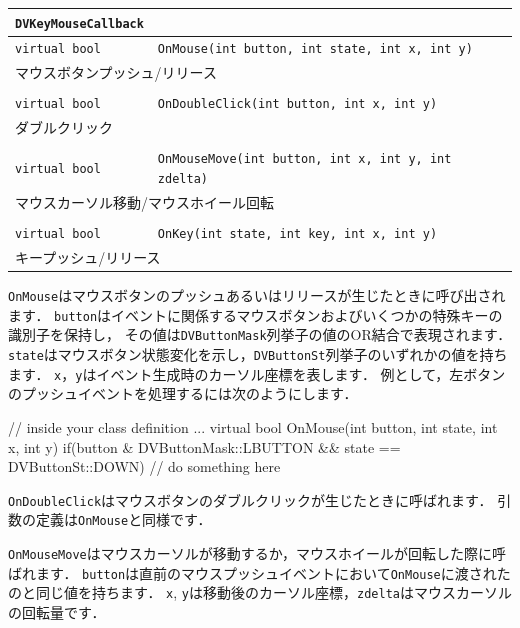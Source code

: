 \begin{center}
\begin{tabular}{p{.2\hsize}p{.7\hsize}}
\texttt{DVKeyMouseCallback}								\\ \midrule
\texttt{virtual bool} & \texttt{OnMouse(int button, int state, int x, int y)}		\\
\multicolumn{2}{l}{マウスボタンプッシュ/リリース}	\\
\\
\texttt{virtual bool} & \texttt{OnDoubleClick(int button, int x, int y)}			\\
\multicolumn{2}{l}{ダブルクリック}	\\
\\
\texttt{virtual bool} & \texttt{OnMouseMove(int button, int x, int y, int zdelta)}	\\
\multicolumn{2}{l}{マウスカーソル移動/マウスホイール回転}	\\
\\
\texttt{virtual bool} & \texttt{OnKey(int state, int key, int x, int y)}			\\
\multicolumn{2}{l}{キープッシュ/リリース}	\\
\end{tabular}
\end{center}

\texttt{OnMouse}はマウスボタンのプッシュあるいはリリースが生じたときに呼び出されます．
\texttt{button}はイベントに関係するマウスボタンおよびいくつかの特殊キーの識別子を保持し，
\KLUDGE その値は\texttt{DVButtonMask}列挙子の値のOR結合で表現されます．
\texttt{state}はマウスボタン状態変化を示し，\texttt{DVButtonSt}列挙子のいずれかの値を持ちます．
\texttt{x}，\texttt{y}はイベント生成時のカーソル座標を表します．
\KLUDGE 例として，左ボタンのプッシュイベントを処理するには次のようにします．
\begin{sourcecode}
// inside your class definition ...
virtual bool OnMouse(int button, int state, int x, int y){
    if(button & DVButtonMask::LBUTTON && state == DVButtonSt::DOWN){
        // do something here
    }
}
\end{sourcecode}

\texttt{OnDoubleClick}はマウスボタンのダブルクリックが生じたときに呼ばれます．
\KLUDGE 引数の定義は\texttt{OnMouse}と同様です．

\texttt{OnMouseMove}はマウスカーソルが移動するか，マウスホイールが回転した際に呼ばれます．
\texttt{button}は直前のマウスプッシュイベントにおいて\texttt{OnMouse}に渡されたのと同じ値を持ちます．
\texttt{x}, \texttt{y}は移動後のカーソル座標，\texttt{zdelta}はマウスカーソルの回転量です．

